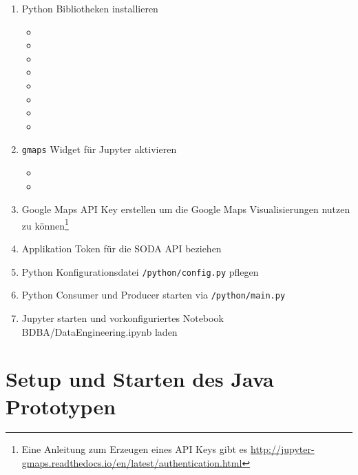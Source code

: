\begin{enumerate}
  \item Python Bibliotheken installieren
  \begin{itemize}
    \item {}
    \item {}
    \item {}
    \item {}
    \item {}
    \item {}
    \item {}
    \item {}
  \end{itemize}
  \item \texttt{gmaps} Widget für Jupyter aktivieren
  \begin{itemize}
    \item {}
    \item {}
  \end{itemize}
  \item Google Maps \ac{API} Key erstellen um die Google Maps Visualisierungen nutzen zu können\footnote{Eine Anleitung zum Erzeugen eines \ac{API} Keys gibt es \hyperref[hier]{http://jupyter-gmaps.readthedocs.io/en/latest/authentication.html}}
  \item Applikation Token für die \ac{SODA} \ac{API} beziehen\autocite{AppToken}
  \item Python Konfigurationsdatei \texttt{/python/config.py} pflegen
  \item Python Consumer und Producer starten via \texttt{/python/main.py}
  \item Jupyter starten und vorkonfiguriertes Notebook BDBA/DataEngineering.ipynb laden
\end{enumerate}

\section{Setup und Starten des Java Prototypen }

